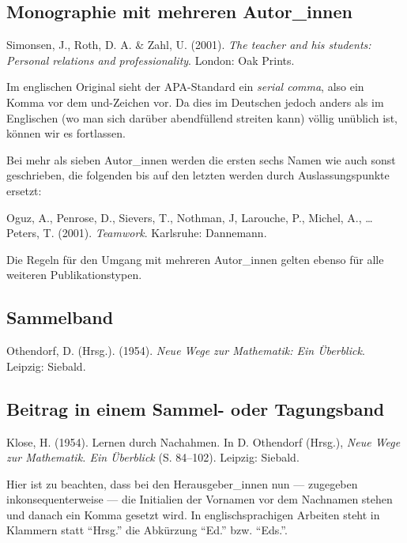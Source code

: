 \documentclass[ngerman,bibliography=totoc,oneside,12pt,a4paper]{scrbook}
\begin{document}
\subsection*{Monographie mit mehreren
Autor\_innen}\label{monographie-mit-mehreren-autor_innen}

Simonsen, J., Roth, D. A. \& Zahl, U. (2001).
\emph{The teacher and his students: Personal relations and
professionality}. London: Oak Prints.

Im englischen Original sieht der APA-Standard ein \emph{serial comma},
also ein Komma vor dem und-Zeichen vor. Da dies im Deutschen jedoch
anders als im Englischen (wo man sich darüber abendfüllend streiten
kann) völlig unüblich ist, können wir es fortlassen.

Bei mehr als sieben Autor\_innen werden die ersten sechs Namen wie auch
sonst geschrieben, die folgenden bis auf den letzten werden durch
Auslassungspunkte ersetzt:

Oguz, A., Penrose, D., Sievers, T., Nothman, J,
Larouche, P., Michel, A., \ldots{} Peters, T. (2001). \emph{Teamwork}.
Karlsruhe: Dannemann.

Die Regeln für den Umgang mit mehreren Autor\_innen gelten ebenso für
alle weiteren Publikationstypen.

\subsection*{Sammelband}\label{sammelband}

Othendorf, D. (Hrsg.). (1954). \emph{Neue Wege zur
Mathematik: Ein Überblick}. Leipzig: Siebald.

\subsection*{Beitrag in einem Sammel- oder
Tagungsband}\label{beitrag-in-einem-sammel--oder-tagungsband}

Klose, H. (1954). Lernen durch Nachahmen. In D.
Othendorf (Hrsg.), \emph{Neue Wege zur Mathematik. Ein Überblick} (S.
84--102). Leipzig: Siebald.

Hier ist zu beachten, dass bei den Herausgeber\_innen nun --- zugegeben
inkonsequenterweise --- die Initialien der Vornamen vor dem Nachnamen
stehen und danach ein Komma gesetzt wird. In englischsprachigen Arbeiten
steht in Klammern statt \enquote{Hrsg.} die Abkürzung \enquote{Ed.} bzw.
\enquote{Eds.}.
\end{document}
